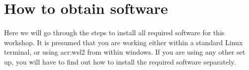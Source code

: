 \section{How to obtain software}
    \paragraph{}
    Here we will go through the steps to install all required software for this workshop. It is presumed that you are working either within a standard Linux terminal, or using \gls{acr:wsl2} from within windows. If you are using any other set up, you will have to find out how to install the required software separately.




